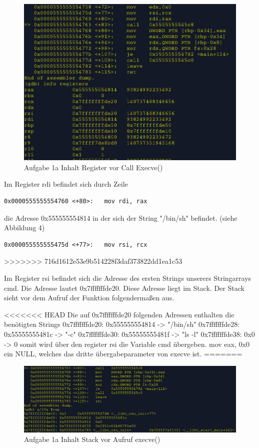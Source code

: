 \documentclass[12pt]{article}
\begin{document}
\begin{figure}[h!]
	\includegraphics[width=15cm]{../images/Bufferoverflow_Aufgabe1a_Reg_b4_call.jpg}
	\caption{Aufgabe 1a Inhalt Register vor Call Execve()}
\end{figure}


\newpage

Im Register rdi befindet sich durch 
Zeile 
\begin{lstlisting}
0x0000555555554760 <+80>:   mov rdi, rax
\end{lstlisting}
die Adresse 0x555555554814 in der sich der String "/bin/sh" befindet. (siehe Abbildung 4)
\begin{lstlisting}
0x000055555555475d <+77>:   mov rsi, rcx
\end{lstlisting} 

>>>>>>> 716d1612e53e9b514228f3daf373822dd1ea1c53

Im Register rsi befindet sich die Adresse
des ersten Strings unserers Stringarrays cmd.
Die Adresse lautet 0x7fffffffde20. 
Diese Adresse liegt im Stack. 
Der Stack sieht vor dem Aufruf der Funktion folgendermaßen aus.

<<<<<<< HEAD
Die auf  0x7fffffffde20 folgenden Adressen enthalten die ben\"otigten Strings
0x7fffffffde20: 0x555555554814  -> "/bin/sh"
0x7fffffffde28: 0x55555555481c	-> "-c"
0x7fffffffde30: 0x55555555481f	-> "ls -l"
0x7fffffffde38: 0x0		-> 0
somit wird \"uber den register rsi die Variable cmd \"ubergeben.
mov eax, 0x0 
ein NULL, welches das dritte \"ubergabeparameter 
von execve ist.
=======
\begin{figure}[h!]
	\includegraphics[width=15cm]{../images/Bufferoverflow_Aufgabe1a_StackVorCallExecve.jpg}
	\caption{Aufgabe 1a Inhalt Stack vor Aufruf execve()}
\end{figure}
\end{document}
